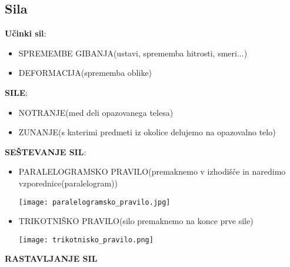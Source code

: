 {\color{indiagreen}\subsection{Sila}}
\textbf{Učinki sil}:
\begin{itemize}
	\item SPREMEMBE GIBANJA(ustavi, sprememba hitrosti, smeri...)
	\item DEFORMACIJA(sprememba oblike)
\end{itemize}
\textbf{SILE}:
\begin{itemize}
	\item NOTRANJE(med deli opazovanega telesa)
	\item ZUNANJE(s katerimi predmeti iz okolice delujemo na opazovalno telo)
\end{itemize}
\textbf{SEŠTEVANJE SIL}:
\begin{itemize}
	\item PARALELOGRAMSKO PRAVILO(premaknemo v izhodišče in naredimo vzporednice(paralelogram))
	\begin{center}
		\texttt{[image: paralelogramsko\_pravilo.jpg]}
	\end{center}
	\item TRIKOTNIŠKO PRAVILO(silo premaknemo na konce prve sile)
	\begin{center}
		\texttt{[image: trikotnisko\_pravilo.png]}
	\end{center}
\end{itemize}
\textbf{RASTAVLJANJE SIL}
